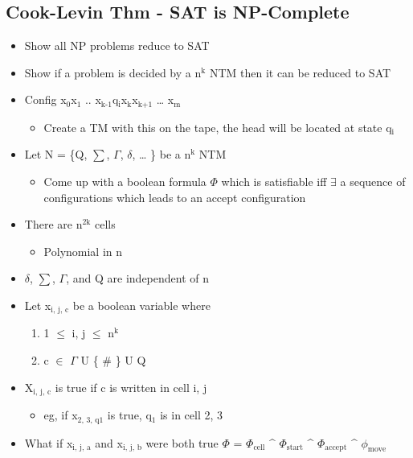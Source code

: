 \documentclass[11pt]{article}
\begin{document}
\subsection{Cook-Levin Thm - SAT is NP-Complete}
\label{sec:org9f9ae1b}
\begin{itemize}
\item Show all NP problems reduce to SAT
\item Show if a problem is decided by a n\(^{\text{k}}\) NTM then it can be reduced to SAT
\item Config
x\(_{\text{0}}\)x\(_{\text{1}}\) .. x\(_{\text{k-1}}\)q\(_{\text{i}}\)x\(_{\text{k}}\)x\(_{\text{k+1}}\) \ldots{} x\(_{\text{m}}\)
\begin{itemize}
\item Create a TM with this on the tape, the head will be located at state q\(_{\text{i}}\)
\end{itemize}
\item Let N = \{Q, \(\sum\), \(\Gamma\), \(\delta\), \ldots{} \} be a n\(^{\text{k}}\) NTM
\begin{itemize}
\item Come up with a boolean formula \(\Phi\) which is satisfiable iff \(\exists\) a sequence of configurations which leads to an accept configuration
\end{itemize}
\item There are n\(^{\text{2k}}\) cells
\begin{itemize}
\item Polynomial in n
\end{itemize}
\item \(\delta\), \(\sum\), \(\Gamma\), and Q are independent of n
\item Let x\(_{\text{i, j, c}}\) be a boolean variable where
\begin{enumerate}
\item 1 \(\le\) i, j \(\le\) n\(^{\text{k}}\)
\item c \(\in\) \(\Gamma\) U \{ \# \} U Q
\end{enumerate}
\item X\(_{\text{i, j, c}}\) is true if c is written in cell i, j
\begin{itemize}
\item eg, if x\(_{\text{2, 3, q1}}\) is true, q\(_{\text{1}}\) is in cell 2, 3
\end{itemize}
\item What if x\(_{\text{i, j, a}}\) and x\(_{\text{i, j, b}}\) were both true
\(\Phi\) = \(\Phi_{\text{cell}}\) \^{} \(\Phi_{\text{start}}\) \^{} \(\Phi_{\text{accept}}\) \^{} \(\phi_{\text{move}}\)

\end{itemize}
\end{document}
